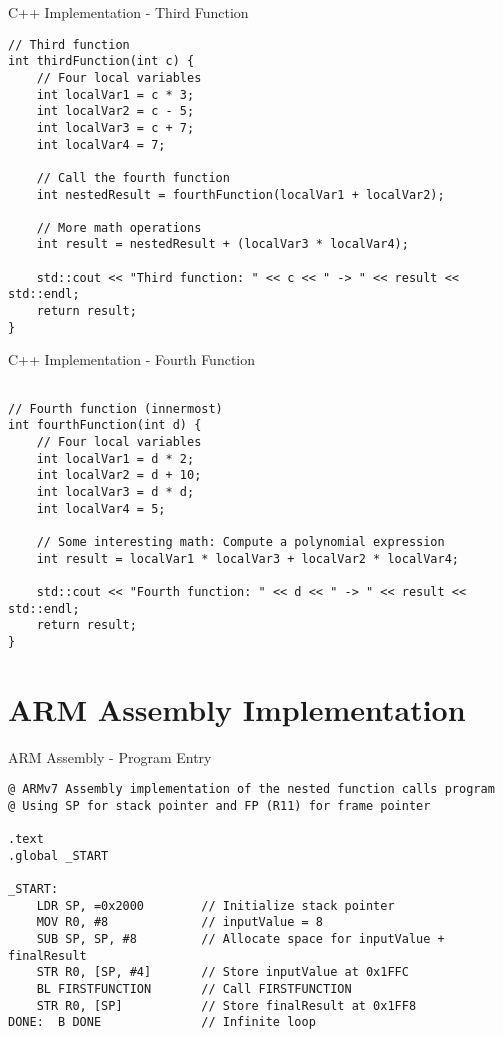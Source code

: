 \documentclass[aspectratio=169]{beamer}
\begin{document}
\begin{frame}[fragile]{C++ Implementation - Third Function}
    \begin{verbatim}
// Third function
int thirdFunction(int c) {
    // Four local variables
    int localVar1 = c * 3;
    int localVar2 = c - 5;
    int localVar3 = c + 7;
    int localVar4 = 7;
    
    // Call the fourth function
    int nestedResult = fourthFunction(localVar1 + localVar2);
    
    // More math operations
    int result = nestedResult + (localVar3 * localVar4);
    
    std::cout << "Third function: " << c << " -> " << result << std::endl;
    return result;
}

\end{verbatim}
\end{frame}

\begin{frame}[fragile]{C++ Implementation - Fourth Function}
    \begin{verbatim}

// Fourth function (innermost)
int fourthFunction(int d) {
    // Four local variables
    int localVar1 = d * 2;
    int localVar2 = d + 10;
    int localVar3 = d * d;
    int localVar4 = 5;
    
    // Some interesting math: Compute a polynomial expression
    int result = localVar1 * localVar3 + localVar2 * localVar4;
    
    std::cout << "Fourth function: " << d << " -> " << result << std::endl;
    return result;
}
    \end{verbatim}
\end{frame}

\section{ARM Assembly Implementation}

\begin{frame}[fragile]{ARM Assembly - Program Entry}
    \begin{verbatim}
@ ARMv7 Assembly implementation of the nested function calls program
@ Using SP for stack pointer and FP (R11) for frame pointer

.text
.global _START

_START:
    LDR SP, =0x2000        // Initialize stack pointer
    MOV R0, #8             // inputValue = 8
    SUB SP, SP, #8         // Allocate space for inputValue + finalResult
    STR R0, [SP, #4]       // Store inputValue at 0x1FFC
    BL FIRSTFUNCTION       // Call FIRSTFUNCTION
    STR R0, [SP]           // Store finalResult at 0x1FF8
DONE:  B DONE              // Infinite loop
    \end{verbatim}
\end{frame}
\end{document}
